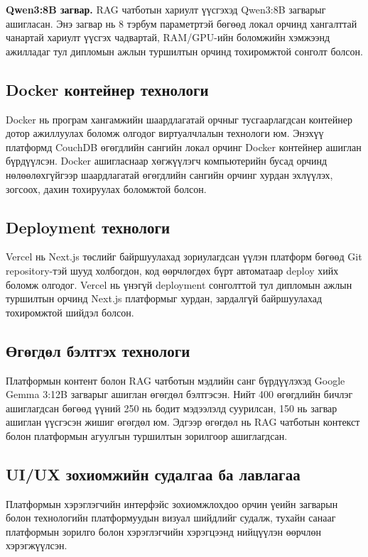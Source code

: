 \textbf{Qwen3:8B загвар.} RAG чатботын хариулт үүсгэхэд Qwen3:8B загварыг ашигласан. Энэ загвар нь 8 тэрбум параметртэй бөгөөд локал орчинд хангалттай чанартай хариулт үүсгэх чадвартай, RAM/GPU-ийн боломжийн хэмжээнд ажилладаг тул дипломын ажлын туршилтын орчинд тохиромжтой сонголт болсон.

\subsection*{Docker контейнер технологи}

Docker нь програм хангамжийн шаардлагатай орчныг тусгаарлагдсан контейнер дотор ажиллуулах боломж олгодог виртуалчлалын технологи юм. Энэхүү платформд CouchDB өгөгдлийн сангийн локал орчинг Docker контейнер ашиглан бүрдүүлсэн. Docker ашигласнаар хөгжүүлэгч компьютерийн бусад орчинд нөлөөлөхгүйгээр шаардлагатай өгөгдлийн сангийн орчинг хурдан эхлүүлэх, зогсоох, дахин тохируулах боломжтой болсон.

\subsection*{Deployment технологи}

Vercel нь Next.js төслийг байршуулахад зориулагдсан үүлэн платформ бөгөөд Git repository-тэй шууд холбогдон, код өөрчлөгдөх бүрт автоматаар deploy хийх боломж олгодог. Vercel нь үнэгүй deployment сонголттой тул дипломын ажлын туршилтын орчинд Next.js платформыг хурдан, зардалгүй байршуулахад тохиромжтой шийдэл болсон.

\subsection*{Өгөгдөл бэлтгэх технологи}

Платформын контент болон RAG чатботын мэдлийн санг бүрдүүлэхэд Google Gemma 3:12B загварыг ашиглан өгөгдөл бэлтгэсэн. Нийт 400 өгөгдлийн бичлэг ашиглагдсан бөгөөд үүний 250 нь бодит мэдээлэлд суурилсан, 150 нь загвар ашиглан үүсгэсэн жишиг өгөгдөл юм. Эдгээр өгөгдөл нь RAG чатботын контекст болон платформын агуулгын туршилтын зорилгоор ашиглагдсан.

\subsection*{UI/UX зохиомжийн судалгаа ба лавлагаа}

Платформын хэрэглэгчийн интерфэйс зохиомжлохдоо орчин үеийн загварын болон технологийн платформуудын визуал шийдлийг судалж, тухайн санааг платформын зорилго болон хэрэглэгчийн хэрэгцээнд нийцүүлэн өөрчлөн хэрэгжүүлсэн.

